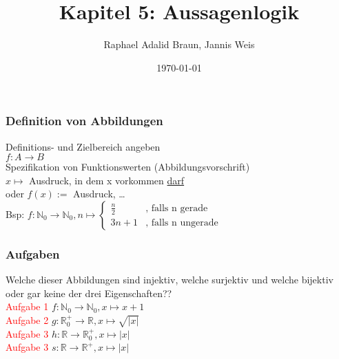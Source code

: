 \documentclass{beamer}
\title{Kapitel 5: Aussagenlogik}
\author{Raphael Adalid Braun, Jannis Weis}
\date{\today}
\institute{KIT - Karlruher Institut für Technologie}
\begin{document}
	\begin{frame}
		\frametitle{Definition von Abbildungen}
		Definitions- und Zielbereich angeben\\
		$f: A\longrightarrow B$\\
		Spezifikation von Funktionswerten (Abbildungsvorschrift)\\
		$x\mapsto$ Ausdruck, in dem x vorkommen \underline{darf}\\
		oder $f(x) :=$ Ausdruck, \dots\\
		Bsp: $f: \mathbb{N}_0\longrightarrow\mathbb{N}_0, n\mapsto
		\begin{cases}
			\frac{n}{2} & \text{, falls n gerade}\\
			3n+1 & \text{, falls n ungerade}
		\end{cases}$
	\end{frame}
	\begin{frame}
		\frametitle{Aufgaben}
		Welche dieser Abbildungen sind injektiv, welche surjektiv und welche bijektiv oder gar keine der drei Eigenschaften??\\
		\textcolor{red}{Aufgabe 1} $f:\mathbb{N}_0\longrightarrow\mathbb{N}_0, x\mapsto x+1$\\
		\textcolor{red}{Aufgabe 2} $g:\mathbb{R}_0^+\longrightarrow\mathbb{R}, x\mapsto\sqrt{\lvert x\rvert}$\\
		\textcolor{red}{Aufgabe 3} $h:\mathbb{R}\longrightarrow\mathbb{R}_0^+, x\mapsto\lvert x\rvert$\\
		\textcolor{red}{Aufgabe 3} $s:\mathbb{R}\longrightarrow\mathbb{R}^+, x\mapsto\lvert x\rvert$
	\end{frame}
\end{document}
